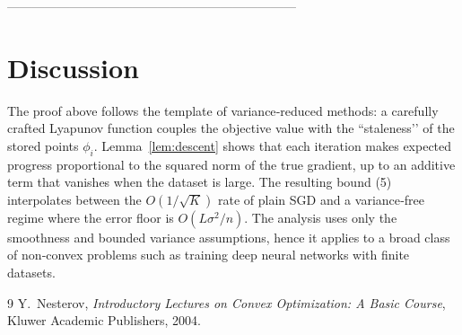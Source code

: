 \documentclass{article}
\begin{document}
---------------------------------------------------------------------

\section*{Discussion}

The proof above follows the template of variance‑reduced methods: a carefully crafted Lyapunov function couples the objective value with the “staleness’’ of the stored points $\phi_i$. Lemma~\ref{lem:descent} shows that each iteration makes expected progress proportional to the squared norm of the true gradient, up to an additive term that vanishes when the dataset is large. The resulting bound (5) interpolates between the $O(1/\sqrt{K})$ rate of plain SGD and a variance‑free regime where the error floor is $O(L\sigma^{2}/n)$. The analysis uses only the smoothness and bounded variance assumptions, hence it applies to a broad class of non‑convex problems such as training deep neural networks with finite datasets.

\begin{thebibliography}{9}
Y.~Nesterov, \emph{Introductory Lectures on Convex Optimization: A Basic Course}, Kluwer Academic Publishers, 2004.
\end{thebibliography}
\end{document}
